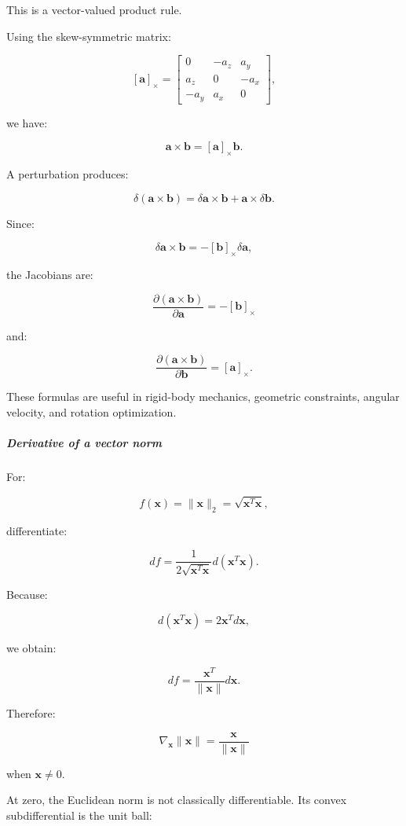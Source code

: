This is a vector-valued product rule.

Using the skew-symmetric matrix:

\[
[\mathbf a]_\times= \begin{bmatrix} 0&-a_z&a_y\\ a_z&0&-a_x\\ -a_y&a_x&0 \end{bmatrix},
\]

we have:

\[
\mathbf a\times\mathbf b=[\mathbf a]_\times\mathbf b.
\]

A perturbation produces:

\[
\delta(\mathbf a\times\mathbf b) = \delta\mathbf a\times\mathbf b+ \mathbf a\times\delta\mathbf b.
\]

Since:

\[
\delta\mathbf a\times\mathbf b = -[\mathbf b]_\times\delta\mathbf a,
\]

the Jacobians are:

\[
\boxed{ \frac{\partial(\mathbf a\times\mathbf b)}{\partial\mathbf a} = -[\mathbf b]_\times }
\]

and:

\[
\boxed{ \frac{\partial(\mathbf a\times\mathbf b)}{\partial\mathbf b} = [\mathbf a]_\times }.
\]

These formulas are useful in rigid-body mechanics, geometric constraints, angular velocity, and rotation optimization.

\subparagraph{Derivative of a vector norm}\label{derivative-of-a-vector-norm}

For:

\[
f(\mathbf x)=\|\mathbf x\|_2 = \sqrt{\mathbf x^T\mathbf x},
\]

differentiate:

\[
df= \frac1{2\sqrt{\mathbf x^T\mathbf x}} d(\mathbf x^T\mathbf x).
\]

Because:

\[
d(\mathbf x^T\mathbf x)=2\mathbf x^Td\mathbf x,
\]

we obtain:

\[
df= \frac{\mathbf x^T}{\|\mathbf x\|}d\mathbf x.
\]

Therefore:

\[
\boxed{ \nabla_{\mathbf x}\|\mathbf x\| = \frac{\mathbf x}{\|\mathbf x\|} }
\]

when \(\mathbf x\ne0\).

At zero, the Euclidean norm is not classically differentiable. Its convex subdifferential is the unit ball:

